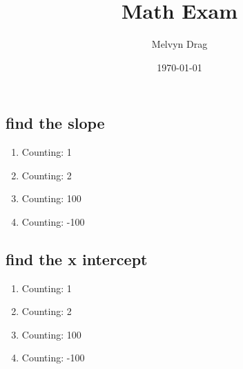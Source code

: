 \documentclass{article}
\title{\textbf{Math Exam}}
\author{
Melvyn Drag
}
\date{\today}
\begin{document}
\maketitle

\subsection{ find the slope }	
\begin{enumerate}
	  \item Counting: 1
	  \item Counting: 2
	  \item Counting: 100
	  \item Counting: -100
\end{enumerate}
\subsection{ find the x intercept }	
\begin{enumerate}
	  \item Counting: 1
	  \item Counting: 2
	  \item Counting: 100
	  \item Counting: -100
\end{enumerate}
\end{document}
